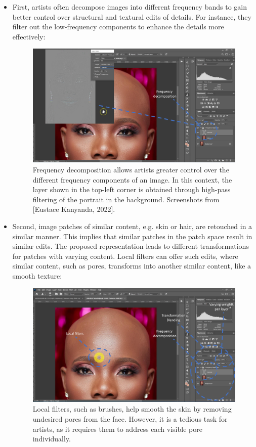 \begin{itemize}
\item First, artists often decompose images into different frequency bands to gain better control over structural and textural edits of details. For instance, they filter out the low-frequency components to enhance the details more effectively:

\begin{figure}[ht]
\centering
\includegraphics[width=\columnwidth]{Chapters/detail-retouching-figs/PS1.pdf}
    \caption{Frequency decomposition allows artists greater control over the different frequency components of an image. In this context, the layer shown in the top-left corner is obtained through high-pass filtering of the portrait in the background. Screenshots from [Eustace Kanyanda, 2022].}

\label{fig:PS-high-pass}
\end{figure}

\item Second, image patches of similar content, e.g. skin or hair, are retouched in a similar manner. This implies that similar patches in the patch space result in similar edits. The proposed representation leads to different transformations for patches with varying content. Local filters can offer such edits, where similar content, such as pores, transforms into another similar content, like a smooth texture:
\begin{figure}[ht]
\centering
\includegraphics[width=\columnwidth]{Chapters/detail-retouching-figs/PS3.pdf}
    \caption{Local filters, such as brushes, help smooth the skin by removing undesired pores from the face. However, it is a tedious task for artists, as it requires them to address each visible pore individually.}


\end{figure}
\end{itemize}
